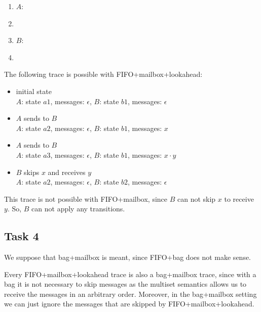 \begin{enumerate}[]
\item $A$:
\item
{}
\item $B$:
\item
{}
\end{enumerate}
The following trace is possible with FIFO+mailbox+lookahead:
\begin{itemize}
\item initial state\\
	$A$: state $a1$, messages: $\epsilon$, $B$: state $b1$, messages: $\epsilon$
\item $A$ sends to $B$\\
	$A$: state $a2$, messages: $\epsilon$, $B$: state $b1$, messages: $x$
\item $A$ sends to $B$\\
	$A$: state $a3$, messages: $\epsilon$, $B$: state $b1$, messages: $x \cdot y$
\item $B$ skips $x$ and receives $y$\\
	$A$: state $a2$, messages: $\epsilon$, $B$: state $b2$, messages: $\epsilon$
\end{itemize}
This trace is not possible with FIFO+mailbox, since $B$ can not skip $x$ to receive $y$. So, $B$ can not apply any transitions.
\subsection{Task 4}
We suppose that bag+mailbox is meant, since FIFO+bag does not make sense.

Every FIFO+mailbox+lookahead trace is also a bag+mailbox trace, since with a bag it is not necessary to skip messages as the multiset semantics allows us to receive the messages in an arbitrary order. Moreover, in the bag+mailbox setting we can just ignore the messages that are skipped by FIFO+mailbox+lookahead.

